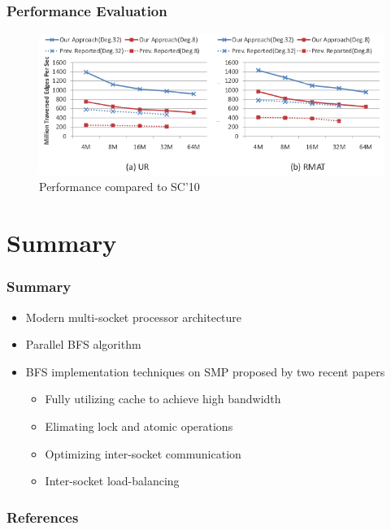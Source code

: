 \documentclass[]{beamer}
\begin{document}
\begin{frame}
  \frametitle{Performance Evaluation}
  \begin{figure}
    \centering
    \includegraphics[width=.8\textwidth]{figures/ipdps12-evaluation}
    \caption{Performance compared to SC'10}
  \end{figure}
\end{frame}

\section{Summary}
\frame{\tableofcontents[currentsection]}

\begin{frame}
  \frametitle{Summary}
  \begin{itemize}
    \item Modern multi-socket processor architecture
    \item Parallel BFS algorithm
    \item BFS implementation techniques on SMP proposed by two recent papers
      \begin{itemize}
        \item Fully utilizing cache to achieve high bandwidth
        \item Elimating lock and atomic operations
        \item Optimizing inter-socket communication
        \item Inter-socket load-balancing
      \end{itemize}
  \end{itemize}
\end{frame}

\begin{frame}
  \frametitle{References}
  
\end{frame}

\end{document}
